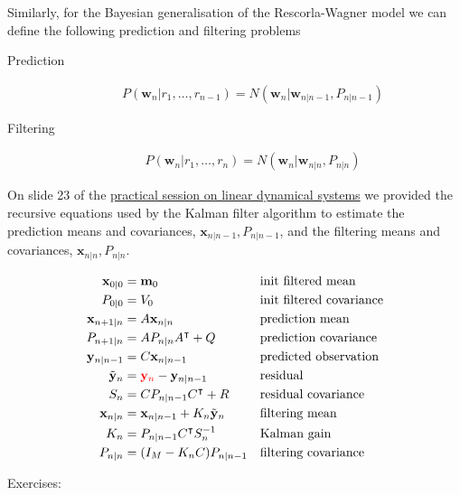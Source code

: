\documentclass[12pt]{article}
\begin{document}
Similarly, for the Bayesian generalisation of the Rescorla-Wagner model we can
define the following prediction and filtering problems

\begin{description}
    \item[Prediction]
        \begin{align}
            P(\mathbf{w}_n|r_1,\ldots,r_{n-1})=N(\mathbf{w}_n|\mathbf{w}_{n|n-1},P_{n|n-1})\nonumber
        \end{align}
    \item[Filtering]
        \begin{align}
            P(\mathbf{w}_n|r_1,\ldots,r_{n})=N(\mathbf{w}_n|\mathbf{w}_{n|n},P_{n|n})\nonumber
        \end{align}
\end{description}

On slide 23 of the
\href{https://www.gatsby.ucl.ac.uk/~rapela/neuroinformatics/2023/ldsLecture/ldsForNeuro.pdf#page=22}{practical
session on linear dynamical systems} we provided the recursive equations used by the
Kalman filter algorithm to estimate the prediction means and covariances,
$\mathbf{x}_{n|n-1},P_{n|n-1}$, and the filtering means and covariances,
$\mathbf{x}_{n|n},P_{n|n}$.

\begin{alignat*}{2}
    \mathbf{x}_{0|0}&=\mathbf{m}_0&&\text{init filtered mean}\\
    P_{0|0}&=V_0&&\text{init filtered covariance}\\
    \mathbf{x}_{n+1|n}&=A\mathbf{x}_{n|n}\quad&&\text{prediction mean}\\
    P_{n+1|n}&=AP_{n|n}A^\intercal+Q\quad&&\text{prediction covariance}\\
    \mathbf{y}_{n|n-1}&=C\mathbf{x}_{n|n-1}\quad&&\text{predicted observation}\\
    \tilde{\mathbf{y}}_n&=\textcolor{red}{\mathbf{y}_n}-\mathbf{y}_{n|n-1}\quad&&\text{residual}\\
    S_n&=CP_{n|n-1}C^\intercal+R\quad&&\text{residual covariance}\\
    \mathbf{x}_{n|n}&=\mathbf{x}_{n|n-1}+K_n\tilde{\mathbf{y}}_n\quad&&\text{filtering mean}\\
    K_n&=P_{n|n-1}C^\intercal S_n^{-1}&&\text{Kalman gain}\\
    P_{n|n}&=(I_M-K_nC)P_{n|n-1}&&\text{filtering covariance}
\end{alignat*}

Exercises:
\end{document}
